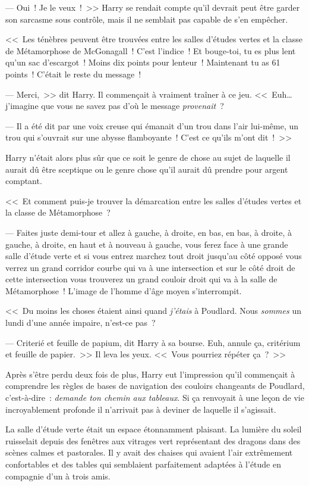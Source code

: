 --- Oui~! Je le veux~!~>> Harry se rendait compte qu'il devrait peut être garder son sarcasme sous contrôle, mais il ne semblait pas capable de s'en empêcher.

<<~Les ténèbres peuvent être trouvées entre les salles d'études vertes et la classe de Métamorphose de McGonagall~! C'est l'indice~! Et bouge-toi, tu es plus lent qu'un sac d'escargot~! Moins dix points pour lenteur~! Maintenant tu as 61 points~! C'était le reste du message~!

--- Merci,~>> dit Harry. Il commençait à vraiment traîner à ce jeu. <<~Euh… j'imagine que vous ne savez pas d'où le message \emph{provenait}~?

--- Il a été dit par une voix creuse qui émanait d'un trou dans l'air lui-même, un trou qui s'ouvrait sur une abysse flamboyante~! C'est ce qu'ils m'ont dit~!~>>

Harry n'était alors plus sûr que ce soit le genre de chose au sujet de laquelle il aurait dû être sceptique ou le genre chose qu'il aurait dû prendre pour argent comptant.

<<~Et comment puis-je trouver la démarcation entre les salles d'études vertes et la classe de Métamorphose~?

--- Faites juste demi-tour et allez à gauche, à droite, en bas, en bas, à droite, à gauche, à droite, en haut et à nouveau à gauche, vous ferez face à une grande salle d'étude verte et si vous entrez marchez tout droit jusqu'au côté opposé vous verrez un grand corridor courbe qui va à une intersection et sur le côté droit de cette intersection vous trouverez un grand couloir droit qui va à la salle de Métamorphose~! L'image de l'homme d'âge moyen s'interrompit.

<<~Du moins les choses étaient ainsi quand \emph{j'étais} à Poudlard. Nous \emph{sommes} un lundi d'une année impaire, n'est-ce pas~?

--- Criterié et feuille de papium, dit Harry à sa bourse. Euh, annule ça, critérium et feuille de papier.~>> Il leva les yeux. <<~Vous pourriez répéter ça~?~>>

Après s'être perdu deux fois de plus, Harry eut l'impression qu'il commençait à comprendre les règles de bases de navigation des couloirs changeants de Poudlard, c'est-à-dire~: \emph{demande ton chemin aux tableaux}. Si ça renvoyait à une leçon de vie incroyablement profonde il n'arrivait pas à deviner de laquelle il s'agissait.

La salle d'étude verte était un espace étonnamment plaisant. La lumière du soleil ruisselait depuis des fenêtres aux vitrages vert représentant des dragons dans des scènes calmes et pastorales. Il y avait des chaises qui avaient l'air extrêmement confortables et des tables qui semblaient parfaitement adaptées à l'étude en compagnie d'un à trois amis.


